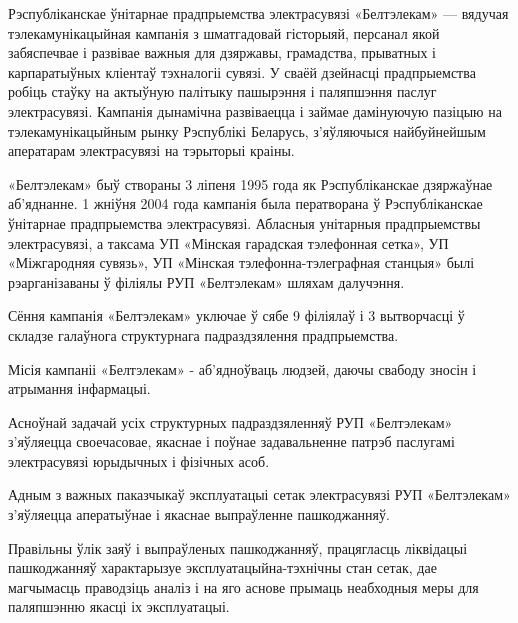 \sectionWithoutNumber{\prefacename}
Рэспубліканскае ўнітарнае прадпрыемства электрасувязі «Белтэлекам» ---
вядучая тэлекамунікацыйная кампанія з шматгадовай гісторыяй,
персанал якой забяспечвае і развівае важныя для дзяржавы, грамадства,
прыватных і карпаратыўных кліентаў тэхналогіі сувязі.
У сваёй дзейнасці прадпрыемства робіць стаўку на актыўную палітыку пашырэння
і паляпшэння паслуг электрасувязі.
Кампанія дынамічна развіваецца і займае дамінуючую пазіцыю на
тэлекамунікацыйным рынку Рэспублікі Беларусь,
з'яўляючыся найбуйнейшым аператарам электрасувязі на тэрыторыі краіны.

«Белтэлекам» быў створаны 3 ліпеня 1995 года як Рэспубліканскае дзяржаўнае аб'яднанне.
1 жніўня 2004 года кампанія была ператворана ў
Рэспубліканскае ўнітарнае прадпрыемства электрасувязі.
Абласныя унітарныя прадпрыемствы электрасувязі,
а таксама УП «Мінская гарадская тэлефонная сетка»,
УП «Міжгародняя сувязь», УП «Мінская тэлефонна-тэлеграфная станцыя»
былі рэарганізаваны ў філіялы РУП «Белтэлекам» шляхам далучэння.

Сёння кампанія «Белтэлекам» уключае ў сябе 9 філіялаў
і 3 вытворчасці ў складзе галаўнога структурнага падраздзялення прадпрыемства.

Місія кампаніі «Белтэлекам» - аб'ядноўваць людзей, даючы свабоду зносін і атрымання інфармацыі.

Асноўнай задачай усіх структурных падраздзяленняў РУП «Белтэлекам»
з'яўляецца своечасовае, якаснае і поўнае задавальненне патрэб паслугамі
электрасувязі юрыдычных і фізічных асоб.

Адным з важных паказчыкаў эксплуатацыі сетак электрасувязі РУП «Белтэлекам»
з'яўляецца аператыўнае і якаснае выпраўленне пашкоджанняў.

Правільны ўлік заяў і выпраўленых пашкоджанняў,
працягласць ліквідацыі пашкоджанняў характарызуе эксплуатацыйна-тэхнічны стан сетак,
дае магчымасць праводзіць аналіз і
на яго аснове прымаць неабходныя меры для паляпшэнню якасці іх эксплуатацыі.

\clearpage
